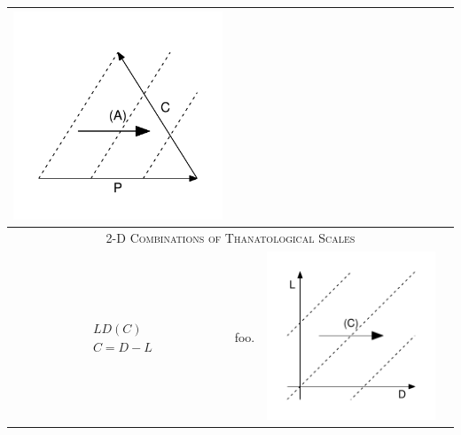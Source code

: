 \documentclass[
  12pt
]{scrartcl}
\begin{document}
\begin{center}
\begin{longtable}{m{}m{}m{}m{}}
  \includegraphics[width = \linewidth]{../fig/CPa_iso.pdf}  \\
  \midrule
  \multicolumn{4}{c}{\textsc{2-D Combinations of Thanatological Scales}} \\
  \midrule
  $$\begin{aligned}
    &LD(C) \\
    &C = D - L
  \end{aligned}$$ &
  foo. &
  \includegraphics[width = \linewidth]{../fig/LDc.pdf} &

\end{longtable}
\end{center}
\end{document}
